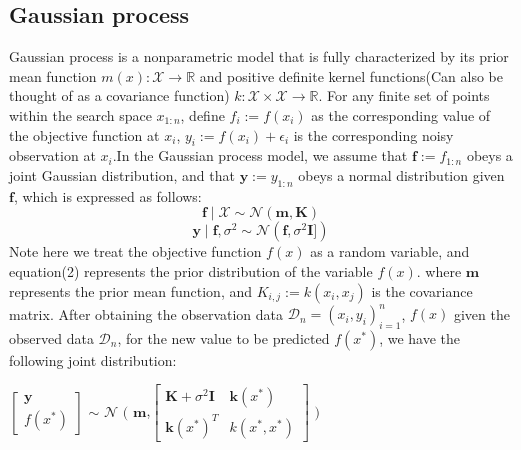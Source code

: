 \documentclass{article}
\begin{document}
\subsection{Gaussian process}
\hspace{2em}Gaussian process is a nonparametric model that is fully characterized by its prior mean function $m(x):\mathcal{X} \rightarrow \mathbb{R}$ and positive definite kernel functions(Can also be thought of as a covariance function) $k:\mathcal{X} \times \mathcal{X} \rightarrow \mathbb{R}$. For any finite set of points within the search space $x_{1:n}$, define $f_i:=f(x_i)$ as the corresponding value of the objective function at $x_i$, $y_i:=f(x_i)+\epsilon_i$ is the corresponding noisy observation at $x_i$.In the Gaussian process model, we assume that $\textbf{f}:=f_{1:n}$ obeys a joint Gaussian distribution, and that $\textbf{y}:=y_{1:n}$ obeys a normal distribution given $\textbf{f}$, which is expressed as follows:
\begin{equation}\label{eq2}
    \textbf{f}\mid\mathcal{X} \sim \mathcal{N}(\textbf{m},\textbf{K})
    \end{equation}
    \begin{equation}\label{eq3}
    \textbf{y}\mid \textbf{f},\sigma^2 \sim \mathcal{N}(\textbf{f},\sigma^2\textbf{I}])
    \end{equation}
Note here we treat the objective function $f(x)$ as a random variable, and equation(2) represents the prior distribution of the variable $f(x)$. where $\textbf{m}$ represents the prior mean function, and $K_{i,j}:=k(x_i,x_j)$ is the covariance matrix. After obtaining the observation data $\mathcal{D}_n={(x_i,y_i)^n_{i=1}}$, $f(x)$ given the observed data $\mathcal{D}_n$, for the new value to be predicted $f(x^*)$, we have the following joint distribution:

\hspace*{\fill}

\qquad \qquad \qquad \quad \quad \quad \quad \quad \quad \quad \quad \quad $\begin{bmatrix} \textbf{y} \\ f(x^*) \end{bmatrix}$ $\sim$ 
$\mathcal{N}$ $\Biggl($ $\textbf{m}$,$\begin{bmatrix} \textbf{K}+\sigma^2\textbf{I} & \textbf{k} (x^*)\\ 
\textbf{k} (x^*)^T & k(x^*,x^*) \end{bmatrix}$ $\Biggl)$\\
\end{document}
